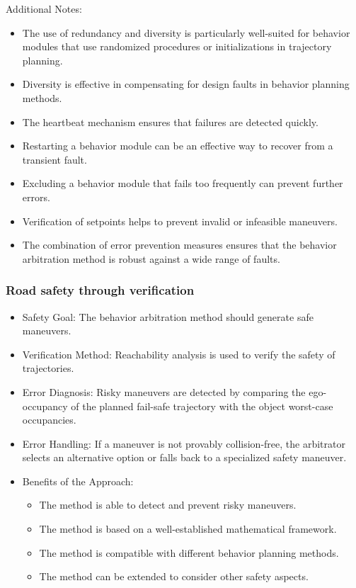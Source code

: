 Additional Notes:

\begin{itemize}
    \item The use of redundancy and diversity is particularly well-suited for behavior modules that use randomized procedures or initializations in trajectory planning.
    \item Diversity is effective in compensating for design faults in behavior planning methods.
    \item The heartbeat mechanism ensures that failures are detected quickly.
    \item Restarting a behavior module can be an effective way to recover from a transient fault.
    \item Excluding a behavior module that fails too frequently can prevent further errors.
    \item Verification of setpoints helps to prevent invalid or infeasible maneuvers.
    \item The combination of error prevention measures ensures that the behavior arbitration method is robust against a wide range of faults.
\end{itemize}

\subsubsection*{Road safety through verification}

\begin{itemize}
\item Safety Goal: The behavior arbitration method should generate safe maneuvers.
\item Verification Method: Reachability analysis is used to verify the safety of trajectories.
\item Error Diagnosis: Risky maneuvers are detected by comparing the ego-occupancy of the planned fail-safe trajectory with the object worst-case occupancies.
\item Error Handling: If a maneuver is not provably collision-free, the arbitrator selects an alternative option or falls back to a specialized safety maneuver.
\item Benefits of the Approach:

\begin{itemize}
    \item The method is able to detect and prevent risky maneuvers.
    \item The method is based on a well-established mathematical framework.
    \item The method is compatible with different behavior planning methods.
    \item The method can be extended to consider other safety aspects.
\end{itemize}

\end{itemize}

